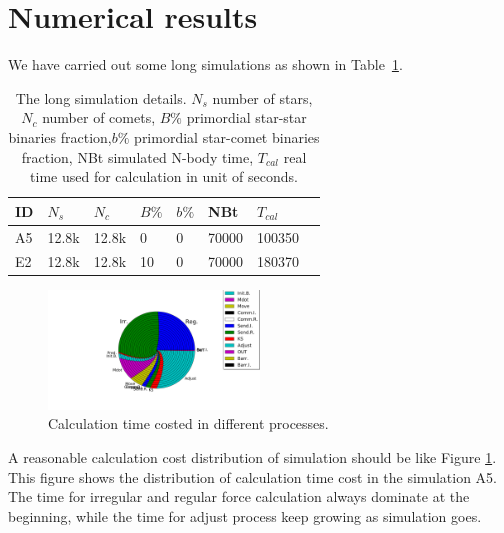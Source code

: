 \documentclass[usenatbib]{mnras}
\begin{document}


\section{Numerical results}\label{section:results}

We have carried out some long simulations as shown in Table~\ref{table:details}.

\begin{table}
\caption{The long simulation details. $N_{s}$ number of stars, $ N_{c}$ number of comets, $B\%$ primordial star-star binaries fraction,$b\%$ primordial star-comet binaries fraction, NBt simulated N-body time, $T_{cal}$ real time used for calculation in unit of seconds. \label{table:details}}
\begin{tabular}{llllllll}
\hline
\hline ID        &   $N_{s}$    &   $N_{c}$ &  $B\%$  &    $b\%$    &      NBt      & $T_{cal}$        \\
\hline A5      &   12.8k     &   12.8k     &    0        &    0             &      70000  &      100350      \\
\hline E2      &   12.8k     &   12.8k     &    10      &    0             &      70000  &      180370      \\
\hline
\hline
\end{tabular}
\end{table}

\begin{figure}
  \centering
  \includegraphics[width=0.5\textwidth,height=!]{PE.pdf}
  \caption{Calculation time costed in different processes.}
  \label{fig:PE}
\end{figure}

A reasonable calculation cost distribution of simulation should be like Figure  \ref{fig:PE}. This figure shows the distribution of calculation time cost in  the simulation A5. The time for irregular and regular force calculation always dominate at the beginning, while the time for adjust process keep growing as simulation goes.
\end{document}
